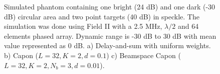 \documentclass[journal]{IEEEtran}
\begin{document}
\begin{figure}[!t]
\centerline{
\hfil
{}
\hfil
{}}
\caption{Simulated phantom containing one bright (24 dB) and one dark (-30 dB) circular area and two point targets (40 dB) in speckle. The simulation was done using Field II with a 2.5 MHz, $\lambda/2$ and 64 elements phased array. Dynamic range is -30 dB to 30 dB with mean value represented as 0 dB. a) Delay-and-sum with uniform weights. b) Capon ($L=32, K=2, d=0.1$) c) Beamspace Capon ($L=32, K=2, N_b=3, d=0.01$).}
\label{fig:phantom}
\end{figure}
\end{document}
